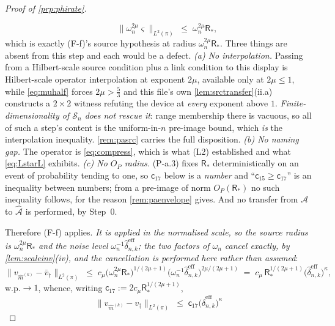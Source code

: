 \begin{proof}[Proof of \cref{prp:phirate}]
\begin{enumerate}
\[\qquad
\big\|\omega_n^{2\mu}\varsigma\big\|_{L^{2}(\pi)}\;\le\;\omega_n^{2\mu}\mathsf R_\ast ,
\]
which is exactly (F-f)'s source hypothesis at radius $\omega_n^{2\mu}\mathsf R_\ast$.
Three things are absent from this step and each would be a defect. \emph{(a) No interpolation.}
Passing from a Hilbert-scale source condition plus a link condition to this display is Hilbert-scale
operator interpolation at exponent $2\mu$, available only at
$2\mu\le1$, while \eqref{eq:muhalf} forces $2\mu>\tfrac53$ and this file's own
\cref{lem:srctransfer}(ii.a) constructs a $2\times2$ witness refuting the device at \emph{every}
exponent above $1$.
\emph{Finite-dimensionality of $\mathcal S_n$ does not rescue it}: range membership there is vacuous, so
all of such a step's content is the uniform-in-$n$ pre-image bound, which \emph{is} the interpolation
inequality. \cref{rem:pasrc} carries the full disposition. \emph{(b) No naming gap.} The operator is
\eqref{eq:compress}, which is what (L2) established and what \eqref{eq:LstarL} exhibits. \emph{(c) No
$O_P$ radius.} (P-a.3) fixes $\mathsf R_\ast$ deterministically on an event of probability tending to
one, so $\mathsf c_{17}$ below is a \emph{number} and ``$\mathsf c_{15}\ge\mathsf c_{17}$'' is an
inequality between numbers; from a pre-image of norm $O_P(\mathsf R_\ast)$
no such inequality follows, for the reason \cref{rem:paenvelope} gives.
And no transfer from $\mathcal A$ to $\hat{\mathcal A}$ is performed, by Step~0.
\end{enumerate}
Therefore (F-f) applies. \emph{It is applied in the normalised scale, so the source radius is
$\omega_n^{2\mu}\mathsf R_\ast$ and the noise level $\omega_n^{-1}\hat\delta^{\mathrm{eff}}_{n,k}$; the
two factors of $\omega_n$ cancel exactly, by \cref{lem:scaleinv}(iv), and the cancellation is
performed here rather than assumed}:
\begin{equation}\label{eq:linlf}
\big\|v_{\hat m^{(k)}}-\bar v_\dagger\big\|_{L^{2}(\pi)}
\;\le\;c_\mu\big(\omega_n^{2\mu}\mathsf R_\ast\big)^{1/(2\mu+1)}
\big(\omega_n^{-1}\hat\delta^{\mathrm{eff}}_{n,k}\big)^{2\mu/(2\mu+1)}
\;=\;c_\mu\,\mathsf R_\ast^{1/(2\mu+1)}\big(\hat\delta^{\mathrm{eff}}_{n,k}\big)^{\kappa} ,
\end{equation}
w.p.$\to1$, whence, writing $\mathsf c_{17}:=2c_\mu\mathsf R_\ast^{1/(2\mu+1)}$,
\begin{equation}\label{eq:linlftot}
\big\|v_{\hat m^{(k)}}-v_\dagger\big\|_{L^{2}(\pi)}
\;\le\;\mathsf c_{17}\big(\hat\delta^{\mathrm{eff}}_{n,k}\big)^{\kappa}

\end{equation}
\end{proof}
